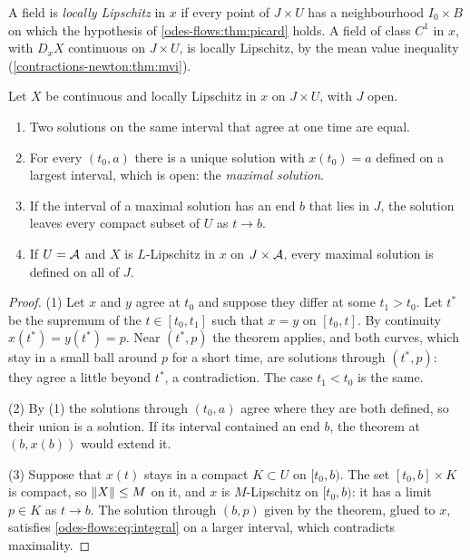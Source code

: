 \begin{notechapter}
A field is \emph{locally Lipschitz} in $x$ if every point of
$J\times U$ has a neighbourhood $I_0\times B$ on which the hypothesis
of \cref{odes-flows:thm:picard} holds. A field of class $C^1$ in $x$,
with $D_xX$ continuous on $J\times U$, is locally Lipschitz, by the
mean value inequality (\cref{contractions-newton:thm:mvi}).

\begin{corollary}\label{odes-flows:cor:maximal}
Let $X$ be continuous and locally Lipschitz in $x$ on $J\times U$, with
$J$ open.
\begin{enumerate}[nosep]
  \item Two solutions on the same interval that agree at one time are
        equal.
  \item For every $(t_0, a)$ there is a unique solution with
        $x(t_0) = a$ defined on a largest interval, which is open: the
        \emph{maximal solution}.
  \item If the interval of a maximal solution has an end $b$ that
        lies in $J$, the solution leaves every compact subset of $U$
        as $t\to b$.
  \item If $U = \mathcal{A}$ and $X$ is $L$-Lipschitz in $x$ on $J\times\mathcal{A}$,
        every maximal solution is defined on all of $J$.
\end{enumerate}
\end{corollary}

\begin{proof}
(1) Let $x$ and $y$ agree at $t_0$ and suppose they differ at some
$t_1 > t_0$. Let $t^*$ be the supremum of the $t\in[t_0, t_1]$ such
that $x = y$ on $[t_0, t]$. By continuity $x(t^*) = y(t^*) = p$. Near
$(t^*, p)$ the theorem applies, and both curves, which stay in a small
ball around $p$ for a short time, are solutions through $(t^*, p)$:
they agree a little beyond $t^*$, a contradiction. The case
$t_1 < t_0$ is the same.

(2) By (1) the solutions through $(t_0, a)$ agree where they are both
defined, so their union is a solution. If its interval contained an
end $b$, the theorem at $(b, x(b))$ would extend it.

(3) Suppose that $x(t)$ stays in a compact $K\subset U$ on
$[t_0, b)$. The set $[t_0, b]\times K$ is compact, so
$\left\|X\right\|\leq M$ on it, and $x$ is $M$-Lipschitz on $[t_0, b)$: it has
a limit $p\in K$ as $t\to b$. The solution through $(b, p)$ given by
the theorem, glued to $x$, satisfies \eqref{odes-flows:eq:integral} on
a larger interval, which contradicts maximality.


\end{proof}
\end{notechapter}
